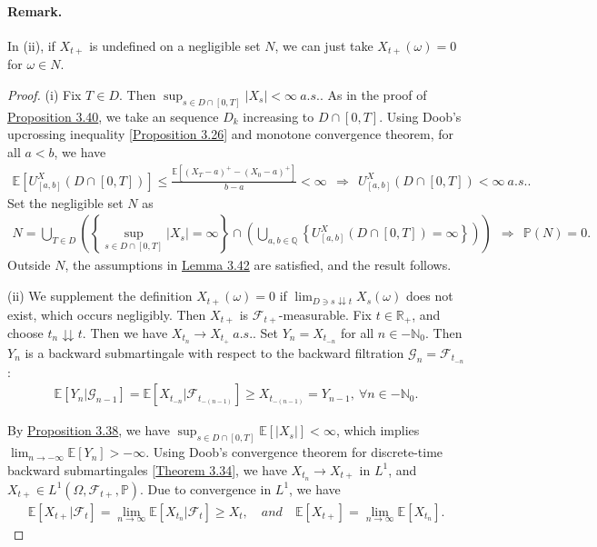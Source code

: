 \documentclass{article}
\numberwithin{equation}{section}
\newcommand{\E}{\mathbb{E}}
\renewcommand{\P}{\mathbb{P}}
\theoremstyle{plain}
\theoremstyle{definition}
\begin{document}
\paragraph{Remark.} In (ii), if $X_{t+}$ is undefined on a negligible set $N$, we can just take $X_{t+}(\omega)=0$ for $\omega\in N$.
\begin{proof}
(i) Fix $T\in D$. Then $\sup_{s\in D\cap[0,T]}\vert X_s\vert<\infty\ a.s.$. As in the proof of \hyperref[prop:3.40]{Proposition 3.40}, we take an sequence $D_k$ increasing to $D\cap[0,T]$. Using Doob's upcrossing inequality [\hyperref[prop:3.26]{Proposition 3.26}] and monotone convergence theorem, for all $a<b$, we have
\begin{align*}
	\E\left[U_{[a,b]}^X(D\cap[0,T])\right]\leq\frac{\E\left[(X_T-a)^+-(X_0-a)^+\right]}{b-a}<\infty\ \ \Rightarrow\ \ U_{[a,b]}^X(D\cap[0,T])<\infty\ a.s..
\end{align*}
Set the negligible set $N$ as
\begin{align*}
	N=\bigcup_{T\in D}\left(\left\{\sup_{s\in D\cap[0,T]}\vert X_s\vert=\infty\right\}\cap\left(\bigcup_{a,b\in\mathbb{Q}}\left\{U_{[a,b]}^X(D\cap[0,T])=\infty\right\}\right)\right)\ \ \Rightarrow\ \ \P(N)=0.\tag{3.8}\label{eq:3.8}
\end{align*}
Outside $N$, the assumptions in \hyperref[lemma:3.42]{Lemma 3.42} are satisfied, and the result follows.\vspace{0.1cm}

(ii) We supplement the definition $X_{t+}(\omega)=0$ if $\lim_{D\ni s\downdownarrows t} X_s(\omega)$ does not exist, which occurs negligibly. Then $X_{t+}$ is $\mathscr{F}_{t+}$-measurable. Fix $t\in\mathbb{R}_+$, and choose $t_n\downdownarrows t$. Then we have $X_{t_n}\to X_{t_+}\ a.s.$. Set $Y_n=X_{t_{-n}}$ for all $n\in-\mathbb{N}_0$. Then $Y_n$ is a backward submartingale with respect to the backward filtration $\mathscr{G}_n=\mathscr{F}_{t_{-n}}$:
\begin{align*}
	\E[Y_n|\mathscr{G}_{n-1}] = \E[X_{t_{-n}}|\mathscr{F}_{t_{-(n-1)}}] \geq X_{t_{-(n-1)}} = Y_{n-1},\ \forall n\in-\mathbb{N}_0.
\end{align*}

By \hyperref[prop:3.38]{Proposition 3.38}, we have $\sup_{s\in D\cap[0,T]}\E[\vert X_s\vert]<\infty$, which implies $\lim_{n\to-\infty}\E[Y_n]>-\infty$. Using Doob's convergence theorem for discrete-time backward submartingales [\hyperref[thm:3.34]{Theorem 3.34}], we have $X_{t_n}\to X_{t+}$ in $L^1$, and $X_{t+}\in L^1(\Omega,\mathscr{F}_{t+},\P)$. Due to convergence in $L^1$, we have
\begin{align*}
	\E[X_{t+}|\mathscr{F}_t]=\lim_{n\to\infty}\E[X_{t_n}|\mathscr{F}_t]\geq X_t,\quad \textit{and}\quad \E[X_{t+}]=\lim_{n\to\infty}\E[X_{t_n}].
\end{align*}


\end{proof}
\end{document}
